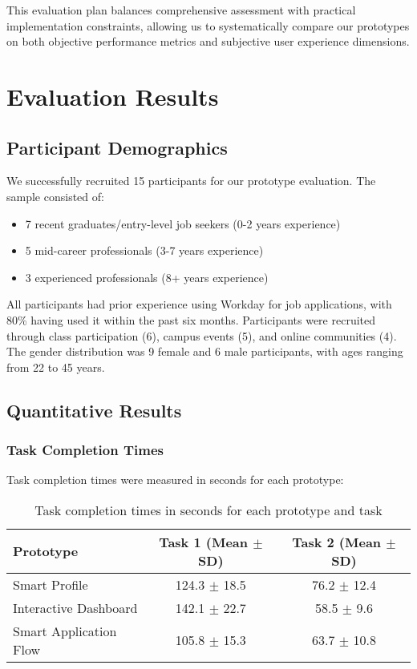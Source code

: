 \documentclass[
	letterpaper, %
]{jdf}
\begin{document}
This evaluation plan balances comprehensive assessment with practical implementation constraints, allowing us to systematically compare our prototypes on both objective performance metrics and subjective user experience dimensions.

\newpage
\section{Evaluation Results}

\subsection{Participant Demographics}

We successfully recruited 15 participants for our prototype evaluation. The sample consisted of:
\begin{itemize}
    \item 7 recent graduates/entry-level job seekers (0-2 years experience)
    \item 5 mid-career professionals (3-7 years experience)
    \item 3 experienced professionals (8+ years experience)
\end{itemize}

All participants had prior experience using Workday for job applications, with 80\% having used it within the past six months. Participants were recruited through class participation (6), campus events (5), and online communities (4). The gender distribution was 9 female and 6 male participants, with ages ranging from 22 to 45 years.

\subsection{Quantitative Results}

\subsubsection{Task Completion Times}

Task completion times were measured in seconds for each prototype:

\begin{table}[h]
\centering
\begin{tabular}{|l|c|c|}
\hline
\textbf{Prototype} & \textbf{Task 1 (Mean $\pm$ SD)} & \textbf{Task 2 (Mean $\pm$ SD)} \\
\hline
Smart Profile & 124.3 $\pm$ 18.5 & 76.2 $\pm$ 12.4 \\
Interactive Dashboard & 142.1 $\pm$ 22.7 & 58.5 $\pm$ 9.6 \\
Smart Application Flow & 105.8 $\pm$ 15.3 & 63.7 $\pm$ 10.8 \\
\hline
\end{tabular}
\caption{Task completion times in seconds for each prototype and task}
\end{table}
\end{document}
